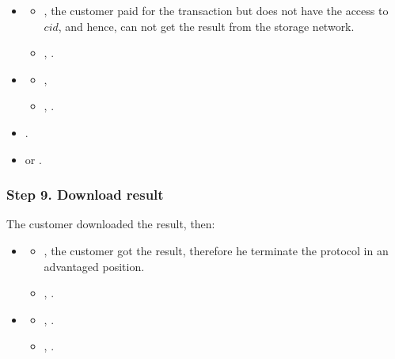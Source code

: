 \ActedAbnormallyThen{\customer}

\begin{itemize}
\item \AgreeablePath
  \begin{itemize}
    \item {}, the customer paid for the transaction but does not have the access to $cid$, and hence, can not get the result from the storage network.
    \item {}, \SpReceivedThePayment{}.
  \end{itemize}
\item \DisputePath
  \begin{itemize}
    \item {}, \CustomerLosesBecauseSPCanProveBeingCorrect{}
    \item {}, .
  \end{itemize}
\end{itemize}


\Fairness

\begin{itemize}
  \item {}.
  \item \CanDoNothing{}  or .
\end{itemize}

\subsubsection*{Step 9. \CustomerTurn{} Download result}\label{step-9-retrieval-of-results}

The customer downloaded the result, then:

\begin{itemize}
\item \AgreeablePath
  \begin{itemize}
    \item {}, the customer got the result, therefore he terminate the protocol in an advantaged position.
    \item {}, .
  \end{itemize}
\item \DisputePath
  \begin{itemize}
    \item {}, \CustomerLosesBecauseSPCanProveBeingCorrect{}.
    \item {}, .
  \end{itemize}
\end{itemize}

